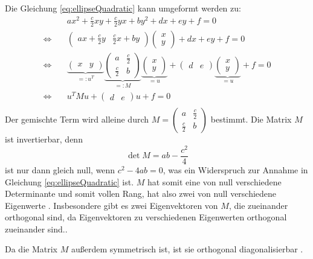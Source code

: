 Die Gleichung \ref{eq:ellipseQuadratic} kann umgeformt werden zu:
\[
\begin{aligned}
&ax^2 + \frac{c}{2}xy + \frac{c}{2}yx + by^2 + dx + ey + f = 0 \\
\Leftrightarrow\quad &\begin{pmatrix}ax +  \frac{c}{2}y & \frac{c}{2}x + by\end{pmatrix}\begin{pmatrix}x \\ y\end{pmatrix} +  dx + ey + f = 0\\
\Leftrightarrow\quad &\underbrace{\begin{pmatrix}x & y\end{pmatrix}}_{=:u^T}\underbrace{\begin{pmatrix}a & \frac{c}{2} \\ \frac{c}{2} & b\end{pmatrix}}_{=: M}\underbrace{\begin{pmatrix}x \\ y\end{pmatrix}}_{=u} +\begin{pmatrix}d & e\end{pmatrix}\underbrace{\begin{pmatrix}x \\ y\end{pmatrix}}_{=u}+ f = 0 \\
\Leftrightarrow\quad &u^TMu +\begin{pmatrix}d & e\end{pmatrix}u + f = 0 \\
\end{aligned}
\]
Der gemischte Term wird alleine durch $M = \begin{pmatrix}a & \frac{c}{2} \\ \frac{c}{2} & b\end{pmatrix}$ bestimmt. Die Matrix $M$ ist invertierbar, denn
\[
\det M = ab - \dfrac{c^2}{4}
\] ist nur dann gleich null, wenn $c^2 - 4ab = 0$, was ein Widerspruch zur Annahme in Gleichung \ref{eq:ellipseQuadratic} ist. $M$ hat somit eine von null verschiedene Determinante und somit vollen Rang, hat also zwei von null verschiedene Eigenwerte \cite{Bosch2006}. Insbesondere gibt es zwei Eigenvektoren von $M$, die zueinander orthogonal sind, da Eigenvektoren zu verschiedenen Eigenwerten orthogonal zueinander sind.\cite{Bosch2006}.

Da die Matrix $M$ außerdem symmetrisch ist, ist sie orthogonal diagonalisierbar \cite{Bosch2006}.


